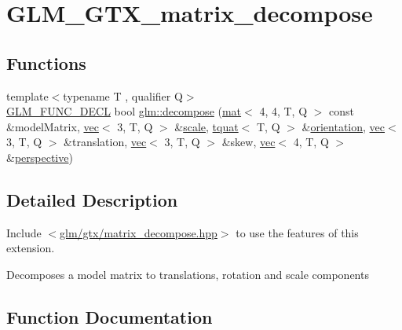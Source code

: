 \hypertarget{group__gtx__matrix__decompose}{}\section{G\+L\+M\+\_\+\+G\+T\+X\+\_\+matrix\+\_\+decompose}
\label{group__gtx__matrix__decompose}
\subsection*{Functions}
\begin{DoxyCompactItemize}
\item 
{\footnotesize template$<$typename T , qualifier Q$>$ }\\\hyperlink{setup_8hpp_ab2d052de21a70539923e9bcbf6e83a51}{G\+L\+M\+\_\+\+F\+U\+N\+C\+\_\+\+D\+E\+CL} bool \hyperlink{group__gtx__matrix__decompose_ga91185463739c855d602596907a9994bc}{glm\+::decompose} (\hyperlink{structglm_1_1mat}{mat}$<$ 4, 4, T, Q $>$ const \&model\+Matrix, \hyperlink{structglm_1_1vec}{vec}$<$ 3, T, Q $>$ \&\hyperlink{_s_d_l__opengl__glext_8h_a281421b881aa7a1266842b73a3bc7655}{scale}, \hyperlink{structglm_1_1tquat}{tquat}$<$ T, Q $>$ \&\hyperlink{group__gtx__rotate__vector_ga1a32fceb71962e6160e8af295c91930a}{orientation}, \hyperlink{structglm_1_1vec}{vec}$<$ 3, T, Q $>$ \&translation, \hyperlink{structglm_1_1vec}{vec}$<$ 3, T, Q $>$ \&skew, \hyperlink{structglm_1_1vec}{vec}$<$ 4, T, Q $>$ \&\hyperlink{group__gtc__matrix__transform_ga747c8cf99458663dd7ad1bb3a2f07787}{perspective})
\end{DoxyCompactItemize}


\subsection{Detailed Description}
Include $<$\hyperlink{matrix__decompose_8hpp}{glm/gtx/matrix\+\_\+decompose.\+hpp}$>$ to use the features of this extension.

Decomposes a model matrix to translations, rotation and scale components 

\subsection{Function Documentation}
\mbox{\label{group__gtx__matrix__decompose_ga91185463739c855d602596907a9994bc}} 
